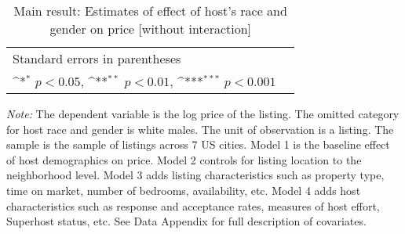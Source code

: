 \documentclass[11pt, oneside]{article}
\begin{document}
\begin{table}[htbp]\centering
	\def\sym#1{\ifmmode^{#1}\else\(^{#1}\)\fi}
	\caption{Main result: Estimates of effect of host’s race and gender on price [without interaction]}
	\begin{tabular}{l*{5}{c}}
		\hline\hline
		
		\hline\hline
		\multicolumn{5}{l}{\footnotesize Standard errors in parentheses}\\
		\multicolumn{5}{l}{\footnotesize \sym{*} \(p<0.05\), \sym{**} \(p<0.01\), \sym{***} \(p<0.001\)}\\
	\end{tabular}
	
	\begin{tablenotes}
		
		\item {\it Note:} The dependent variable is the log price of the listing. The omitted category for host race and gender is white males. The unit of observation is a listing. The sample is the sample of listings across 7 US cities. Model 1 is the baseline effect of host demographics on price. Model 2 controls for listing location to the neighborhood level. Model 3 adds listing characteristics such as property type, time on market, number of bedrooms, availability, etc. Model 4 adds host characteristics such as response and acceptance rates, measures of host effort, Superhost status, etc. See Data Appendix for full description of covariates.  
	\end{tablenotes}
\end{table}



\end{document}
